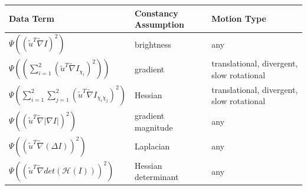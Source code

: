 \documentclass[12pt,a4paper,twoside]{report}
\begin{document}
\begin{center}
	\begin{tabular}{  | l | l | p{5cm} |}
		\hline
		Data Term & Constancy Assumption & Motion Type \\ \hline
		$\Psi \left((\tilde{u}^T\tilde{\nabla}I)^2\right)$ & brightness & any \\ \hline
		
		$\Psi \left((\sum_{i=1}^{2}{(\tilde{u}^T\tilde{\nabla}I_{\chi_i})^2})\right)$ & gradient & translational,
		divergent,
		slow rotational \\ \hline
		
		$\Psi{\left(\sum_{i=1}^{2}\sum_{j=1}^{2}\left(\tilde{u}^T\tilde{\nabla}I_{\chi_i\chi_j}\right)^2\right)}$ & Hessian & translational,
		divergent,
		slow rotational \\
		\hline
		
		$\Psi \left( \left( \tilde{u}^T \tilde{\nabla} |\nabla I| \right)^2 \right)$ & gradient magnitude & any \\
		\hline
		
		$\Psi\left( \left( \tilde{u}^T\tilde{\nabla} \left( \Delta I \right) \right)^2 \right)$ & Laplacian & any \\
		\hline
		
		$\Psi \left( \left( \tilde{u}^T \tilde{\nabla} det \left( \mathcal{H} \left( I \right) \right) \right)^2 \right) $ & Hessian determinant & any \\
		\hline
	\end{tabular}
\end{center}
\end{document}
